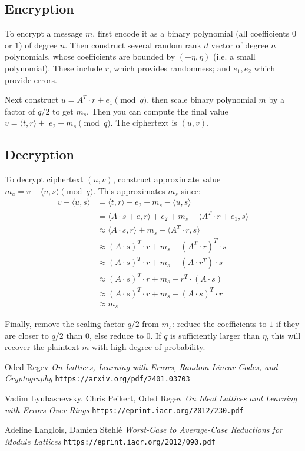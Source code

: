 \documentclass{article}
\begin{document}
\subsection{
  Encryption
}

To encrypt a message $m$, first encode it as a binary polynomial (all coefficients $0$ or $1$) of degree $n$.  Then construct several random rank $d$ vector of degree $n$ polynomials, whose coefficients are bounded by $(-\eta, \eta)$ (i.e. a small polynomial).  These include $r$, which provides randomness; and $e_1, e_2$ which provide errors.

Next construct $u = A^T \cdot r + e_1 \pmod{q}$, then scale binary polynomial $m$ by a factor of $q/2$ to get $m_s$.  Then you can compute the final value $v = \langle t, r \rangle +\;e_2 + m_s \pmod{q}$.  The ciphertext is $(u, v)$.

\subsection{
  Decryption
}

To decrypt ciphertext $(u, v)$, construct approximate value $m_a = v - \langle u, s \rangle \pmod{q}$.  This approximates $m_s$ since:
\begin{align}
  v - \langle u, s \rangle &= \langle t, r \rangle + e_2 + m_s - \langle u, s \rangle\nonumber\\
  &= \langle A \cdot s + e, r \rangle + e_2 + m_s - \langle A^T \cdot r + e_1, s \rangle\nonumber\\
  &\approx \langle A \cdot s, r \rangle + m_s - \langle A^T \cdot r, s \rangle\nonumber\\
  &\approx (A \cdot s)^T \cdot r + m_s - (A^T \cdot r)^T \cdot s\nonumber\\
  &\approx (A \cdot s)^T \cdot r + m_s - (A \cdot r^T) \cdot s\nonumber\\
  &\approx (A \cdot s)^T \cdot r + m_s - r^T \cdot (A \cdot s)\nonumber\\
  &\approx (A \cdot s)^T \cdot r + m_s - (A \cdot s)^T \cdot r\nonumber\\
  &\approx m_s
\end{align}

Finally, remove the scaling factor $q/2$ from $m_s$: reduce the coefficients to $1$ if they are closer to $q/2$ than $0$, else reduce to $0$.  If $q$ is sufficiently larger than $\eta$, this will recover the plaintext $m$ with high degree of probability.


\begin{thebibliography}{3}

  Oded Regev
  \emph{On Lattices, Learning with Errors, Random Linear Codes, and Cryptography}
  \texttt{https://arxiv.org/pdf/2401.03703}

  Vadim Lyubashevsky, Chris Peikert, Oded Regev
  \emph{On Ideal Lattices and Learning with Errors Over Rings}
  \texttt{https://eprint.iacr.org/2012/230.pdf}

  Adeline Langlois, Damien Stehlé
  \emph{Worst-Case to Average-Case Reductions for Module Lattices}
  \texttt{https://eprint.iacr.org/2012/090.pdf}
  
\end{thebibliography}
\end{document}
